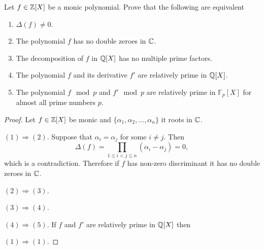     \begin{ex}{14.17}
        Let $f\in\mathbb{Z}[X]$ be a monic polynomial. Prove that the following are equivalent
        \begin{enumerate}
            \item $\Delta(f)\neq 0$.
            \item The polynomial $f$ has no double zeroes in $\mathbb{C}$.
            \item The decomposition of $f$ in $\mathbb{Q}[X]$ has no multiple prime factors.
            \item The polynomial $f$ and its derivative $f'$ are relatively prime in $\mathbb{Q}[X]$.
            \item The polynomial $f\mod p $ and $f' \mod p$ are relatively prime in $\mathbb{F}_p[X]$ for almost all prime numbers $p$.
        \end{enumerate}
    \end{ex}
    \begin{proof}
        Let  $f\in\mathbb{Z}[X]$ be monic and $\{\alpha_1,\alpha_2,\dots,\alpha_n\}$ it roots in $\mathbb{C}$.

        $(1)\Rightarrow  (2)$. Suppose that $\alpha_i=\alpha_j$ for some $i\neq j$. Then 
        $$\Delta(f)=\prod_{1\leq i<j\leq n}(\alpha_i-\alpha_j)= 0,$$ 
        which is a contradiction.
        Therefore if $f$ has non-zero discriminant it has no double zeroes in $\mathbb{C}$. 

        $(2)\Rightarrow (3)$.
        
        $(3)\Rightarrow (4)$.

        $(4)\Rightarrow (5)$. If $f$ and $f'$ are relatively prime in $\mathbb{Q}[X]$ then 

        $(1)\Rightarrow (1)$. 
    \end{proof}


